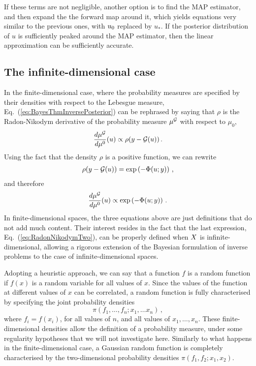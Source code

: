 If these terms are not negligible, another option is to find the MAP estimator,
and then expand the the forward map around it, which yields equations very
similar to the previous ones, with $u_0$ replaced by $u_*$. If the
posterior distribution of $u$ is sufficiently peaked around the
MAP estimator, then the linear approximation can be sufficiently accurate. 


\subsection{The infinite-dimensional case}
\label{sec:infin-dimens-case}

In the finite-dimensional case, where the probability measures are specified by
their densities with respect to the Lebesgue measure,
Eq.~(\ref{eq:BayesThmInversePosterior}) can be rephrased by saying  that $\rho$
is the Radon-Nikodym derivative of the probability measure $\mu^{\mathcal{G}}$ with
respect to $\mu_0$, \viz
\begin{align}
  \label{eq:RadonNikodym}
  \frac{d\mu^{\mathcal{G}}}{d\mu^0} (u) \propto \rho(y-\mathcal{G}(u))\, .
\end{align}
Using the fact that the density $\rho$ is a positive function, we can rewrite 
\begin{align}
  \label{eq:PotentialDef}
  \rho(y-\mathcal{G}(u)) = \exp\left(-\Phi(u;y)\right)\, ,
\end{align}
and therefore
\begin{align}
  \label{eq:RadonNikodymTwo}
  \frac{d\mu^{\mathcal{G}}}{d\mu^0} (u) \propto \exp\left(-\Phi(u;y)\right)\, .
\end{align}
In finite-dimensional spaces, the three equations above are just definitions
that do not add much content. Their interest resides in the fact that the last
expression, Eq.~(\ref{eq:RadonNikodymTwo}), can be properly defined when $X$ is
infinite-dimensional, allowing a rigorous extension of the Bayesian formulation
of inverse problems to the case of infinite-dimensional spaces. 

Adopting a heuristic approach, we can say that a function $f$ is a random
function if $f(x)$ is a random variable for all values of $x$. Since the values
of the function at different values of $x$ can be correlated, a random function
is fully characterised by specifying the joint probability densities
\begin{equation}
  \label{eq:RandomFuncJointProb}
  \pi\left(
    f_1, \ldots, f_n; x_1, \ldots x_n
  \right)\, ,
\end{equation}
where $f_i=f(x_i)$, for all values of $n$, and all values of $x_1, \ldots, x_n$.
These finite-dimensional densities allow the definition of a probability
measure, under some regularity hypotheses that we will not investigate here.
Similarly to what happens in the finite-dimensional case, a Gaussian random
function is completely characterised by the two-dimensional probability
densities $\pi(f_1,f_2;x_1,x_2)$.

